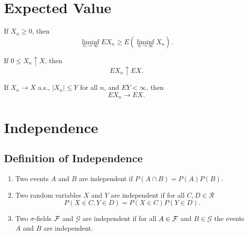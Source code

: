 \section{Expected Value}

\begin{definition}[Expectation] \label{def:expectation}

\end{definition}

\begin{theorem} \label{thm:bounded-convergence-theorem}

\end{theorem}

\begin{theorem} \label{thm:fatou-lemma}
	If $X_n \geq 0$, then
	\begin{equation}
		\liminf _{n \rightarrow \infty} E X_{n} \geq E\left(\liminf _{n \rightarrow \infty} X_{n}\right).
	\end{equation}
\end{theorem}

\begin{theorem} \label{thm:monotone-convergence}
	If $0 \leq X_{n} \uparrow X$, then
	\begin{equation}
		E X_{n} \uparrow E X.
	\end{equation}
\end{theorem}

\begin{theorem} \label{thm:dominated-convergence}
	If $X_{n} \rightarrow X$ a.s., $\left|X_{n}\right| \leq Y$ for all $n$, and $E Y<\infty$, then
	\begin{equation}
		E X_{n} \rightarrow E X.
	\end{equation}
\end{theorem}

\section{Independence}

\subsection{Definition of Independence}

\begin{definition}[Independence]
	\begin{enumerate}
		\item Two events $A$ and $B$ are independent if $P(A \cap B)=P(A) P(B)$.
		\item Two random variables $X$ and $Y$ are independent if for all $C,D\in\mathcal{R}$
		      \begin{equation}
			      P(X\in C,Y\in D)=P(X\in C)P(Y\in D).
		      \end{equation}
		\item Two $\sigma$-fields ${\mathcal F}$ and $\mathcal{G}$ are independent if for all $A\in{\mathcal F}$ and $B\in\mathcal{G}$ the events $A$ and $B$ are independent.
	\end{enumerate}
\end{definition}

